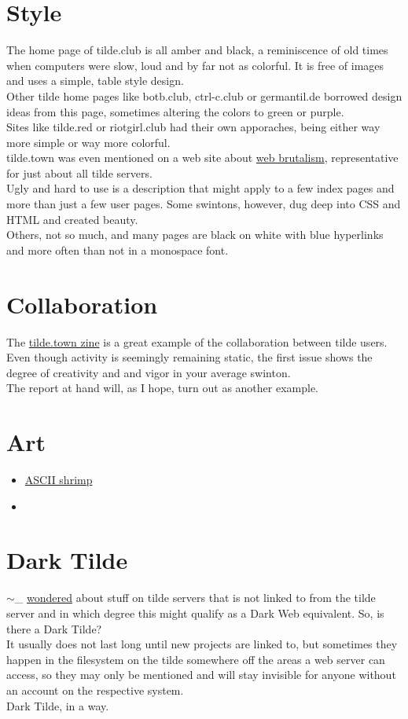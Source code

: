 \section{Style}
The home page of tilde.club is all amber and black, a reminiscence of old times when computers were slow, loud and by far not as colorful. It is free of images and uses a simple, table style design.\\
Other tilde home pages like botb.club, ctrl-c.club or germantil.de borrowed design ideas from this page, sometimes altering the colors to green or purple.\\
Sites like tilde.red or riotgirl.club had their own apporaches, being either way more simple or way more colorful.\\
tilde.town was even mentioned on a web site about \href{http://brutalistwebsites.com/}{web brutalism}, representative for just about all tilde servers.
\\

Ugly and hard to use is a description that might apply to a few index pages and more than just a few user pages. Some swintons, however, dug deep into CSS and HTML and created beauty.\\
Others, not so much, and many pages are black on white with blue hyperlinks and more often than not in a monospace font.

\section{Collaboration}
The \href{https://github.com/tildetown/zine}{tilde.town zine} is a great example of the collaboration between tilde users. Even though activity is seemingly remaining static, the first issue shows the degree of creativity and and vigor in your average swinton.
\\

The report at hand will, as I hope, turn out as another example.
\\

\section{Art}
\begin{itemize}
	\item \href{http://tilde.town/~owenversteeg/}{ASCII shrimp}
	\item
\end{itemize}

\section{Dark Tilde}
$\sim$\_ \href{http://tilde.club/~_/index.html#october222014}{wondered} about stuff on tilde servers that is not linked to from the tilde server and in which degree this might qualify as a Dark Web equivalent. So, is there a Dark Tilde?\\
It usually does not last long until new projects are linked to, but sometimes they happen in the filesystem on the tilde somewhere off the areas a web server can access, so they may only be mentioned and will stay invisible for anyone without an account on the respective system.\\
Dark Tilde, in a way.
